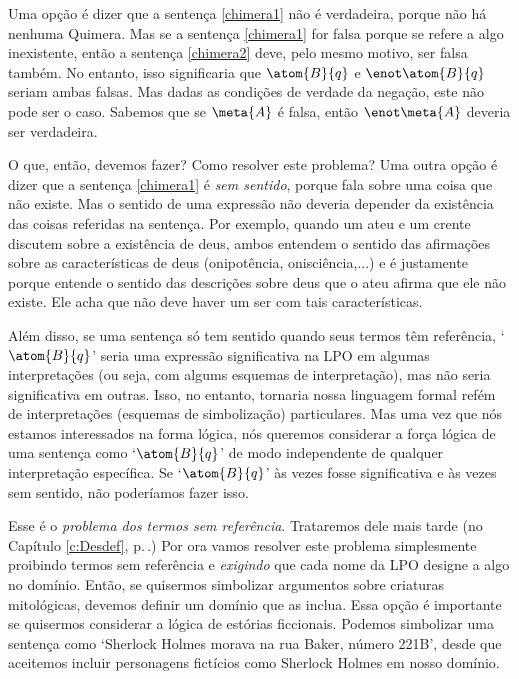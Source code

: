 Uma opção é dizer que a sentença \ref{chimera1} não é verdadeira, porque não há nenhuma Quimera. 
Mas se a sentença \ref{chimera1} for falsa porque se refere a algo inexistente, então a sentença \ref{chimera2} deve, pelo mesmo motivo, ser falsa também.
No entanto, isso significaria que $\atom{B}{q}$ e $\enot \atom{B}{q}$ seriam ambas falsas.
Mas dadas as condições de verdade da negação, este não pode ser o caso.
Sabemos que se $\meta{A}$ é falsa, então $\enot\meta{A}$ deveria ser verdadeira.

O que, então, devemos fazer? Como resolver este problema?
Uma outra opção é dizer que a sentença \ref{chimera1} é \emph{sem sentido}, porque fala sobre uma coisa que não existe.
Mas o sentido de uma expressão não deveria depender da existência das coisas referidas na sentença.
Por exemplo, quando um ateu e um crente discutem sobre a existência de deus, ambos entendem o sentido das afirmações sobre as características de deus (onipotência, onisciência,...) e é justamente porque entende o sentido das descrições sobre deus que o ateu afirma que ele não existe.
Ele acha que não deve haver um ser com tais características.
 
Além disso, se uma sentença só tem sentido quando seus termos têm referência, `$\atom{B}{q}$' seria uma expressão significativa na LPO em algumas interpretações (ou seja, com algums esquemas de interpretação), mas não seria significativa em outras.
Isso, no entanto, tornaria nossa linguagem formal refém de interpretações (esquemas de simbolização) particulares.
Mas uma vez que nós estamos interessados na forma lógica, nós queremos considerar a força lógica de uma sentença como `$\atom{B}{q}$' de modo independente de qualquer interpretação específica.
Se `$\atom{B}{q}$' às vezes fosse significativa e às vezes sem sentido, não poderíamos fazer isso.

Esse é o \emph{problema dos termos sem referência}.
Trataremos dele mais tarde (no Capítulo \ref{c:Desdef}, p.\,\pageref{c:Desdef}.)
Por ora vamos resolver este problema simplesmente proibindo termos sem referência e \emph{exigindo} que cada nome da LPO designe a algo no domínio.
Então, se quisermos simbolizar argumentos sobre criaturas mitológicas, devemos definir um domínio que as inclua.
Essa opção é importante se quisermos considerar a lógica de estórias ficcionais. Podemos simbolizar uma sentença como `Sherlock Holmes morava na rua Baker, número 221B', desde que aceitemos incluir personagens fictícios como Sherlock Holmes em nosso domínio.


